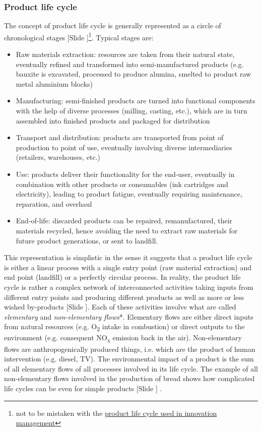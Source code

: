 \documentclass{article}
\newcounter{slide}
\begin{document}
\subsubsection{Product life cycle}
\label{sec:plc}
The concept of product life cycle is generally represented as a circle of chronological stages {\color{blue}[Slide ]}\footnote{not to be mistaken with the \href{https://en.wikipedia.org/wiki/Product_life-cycle_management_(marketing)}{product life cycle used in innovation management}}. Typical stages are:
\begin{itemize}
	\item Raw materials extraction: resources are taken from their natural state, eventually refined and transformed into semi-manufactured products (e.g. bauxite is excavated, processed to produce alumina, smelted to product raw metal aluminium blocks)
	\item Manufacturing: semi-finished products are turned into functional components with the help of diverse processes (milling, casting, etc.), which are in turn assembled into finished products and packaged for distribution
	\item Transport and distribution: products are transported from point of production to point of use, eventually involving diverse intermediaries (retailers, warehouses, etc.)
	\item Use: products deliver their functionality for the end-user, eventually in combination with other products or consumables (ink cartridges and electricity), leading to product fatigue, eventually requiring maintenance, reparation, and overhaul
	\item End-of-life: discarded products can be repaired, remanufactured, their materials recycled, hence avoiding the need to extract raw materials for future product generations, or sent to landfill.
\end{itemize}

This representation is simplistic in the sense it suggests that a product life cycle is either a linear process with a single entry point (raw material extraction) and end point (landfill) or a perfectly circular process. In reality, the product life cycle is rather a complex network of interconnected activities taking inputs from different entry points and producing different products as well as more or less wished by-products {\color{blue}[Slide ]}. Each of these activities involve what are called \emph{elementary} and \emph{non-elementary flows}*. Elementary flows are either direct inputs from natural resources (e.g. O\textsubscript{2} intake in combustion) or direct outputs to the environment (e.g. consequent NO\textsubscript{x} emission back in the air). Non-elementary flows are anthropogenically produced things, i.e. which are the product of human intervention (e.g. diesel, TV). The environmental impact of a product is the sum of all elementary flows of all processes involved in its life cycle. The example of all non-elementary flows involved in the production of bread shows how complicated life cycles can be even for simple products {\color{blue}[Slide ]} \cite{anderssonLifeCycleAssessment1999}.
\end{document}
